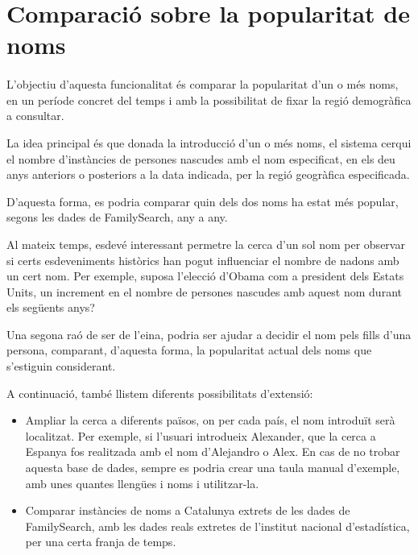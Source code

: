 \section{Comparació sobre la popularitat de noms}

    \paragraph{}
    L'objectiu d'aquesta funcionalitat és comparar la popularitat d'un o més noms, en un període concret del temps i amb la possibilitat de fixar la regió demogràfica a consultar.

    La idea principal és que donada la introducció d'un o més noms, el sistema cerqui el nombre d'instàncies de persones nascudes amb el nom especificat, en els deu anys anteriors o posteriors a la data indicada, per la regió geogràfica especificada.

    D'aquesta forma, es podria comparar quin dels dos noms ha estat més popular, segons les dades de FamilySearch, any a any.

    Al mateix temps, esdevé interessant permetre la cerca d'un sol nom per observar si certs esdeveniments històrics han pogut influenciar el nombre de nadons amb un cert nom. Per exemple, suposa l'elecció d'Obama com a president dels Estats Units, un increment en el nombre de persones nascudes amb aquest nom durant els següents anys?

    Una segona raó de ser de l'eina, podria ser ajudar a decidir el nom pels fills d'una persona, comparant, d'aquesta forma, la popularitat actual dels noms que s'estiguin considerant.

    A continuació, també llistem diferents possibilitats d'extensió:

    \begin{itemize}
        \item Ampliar la cerca a diferents països, on per cada país, el nom introduït serà localitzat. Per exemple, si l'usuari introdueix Alexander, que la cerca a Espanya fos realitzada amb el nom d'Alejandro o Alex. En cas de no trobar aquesta base de dades, sempre es podria crear una taula manual d'exemple, amb unes quantes llengües i noms i utilitzar-la.
        \item Comparar instàncies de noms a Catalunya extrets de les dades de FamilySearch, amb les dades reals extretes de l'institut nacional d'estadística, per una certa franja de temps.
    \end{itemize}

